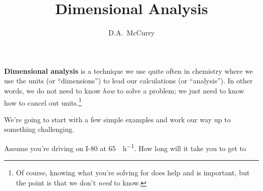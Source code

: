 \documentclass{exam}
\title{Dimensional Analysis}
\author{D.A.\ McCurry}
\begin{document}
\textbf{Dimensional analysis} is a technique we use quite often in chemistry
where we use the units (or ``dimensions'') to lead our calculations (or
``analysis''). In other words, we do not need to know \emph{how} to solve a
problem; we just need to know how to cancel out units.\footnote{Of course,
knowing what you're solving for does help and is important, but the point is
that we don't \emph{need} to know.}

We're going to start with a few simple examples and work our way up to something
challenging.

\begin{questions}
	\question
	Assume you're driving on I-80 at \SI{65}{\mile\per\hour}. How long will
	it take you to get to 

\end{questions}
\end{document}

